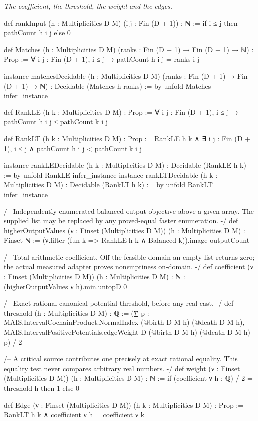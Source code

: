 \documentclass[11pt,a4paper]{article}
\theoremstyle{definition}
\theoremstyle{remark}
\numberwithin{equation}{section}
\begin{document}
\emph{The coefficient, the threshold, the weight and the edges.}
\begin{LeanCode}
def rankInput (h : Multiplicities D M) (i j : Fin (D + 1)) : ℕ :=
  if i ≤ j then pathCount h i j else 0

def Matches (h : Multiplicities D M)
    (ranks : Fin (D + 1) → Fin (D + 1) → ℕ) : Prop :=
  ∀ i j : Fin (D + 1), i ≤ j → pathCount h i j = ranks i j

instance matchesDecidable (h : Multiplicities D M)
    (ranks : Fin (D + 1) → Fin (D + 1) → ℕ) : Decidable (Matches h ranks) := by
  unfold Matches
  infer_instance

def RankLE (h k : Multiplicities D M) : Prop :=
  ∀ i j : Fin (D + 1), i ≤ j → pathCount h i j ≤ pathCount k i j

def RankLT (h k : Multiplicities D M) : Prop :=
  RankLE h k ∧ ∃ i j : Fin (D + 1), i ≤ j ∧ pathCount h i j < pathCount k i j

instance rankLEDecidable (h k : Multiplicities D M) : Decidable (RankLE h k) := by
  unfold RankLE
  infer_instance
instance rankLTDecidable (h k : Multiplicities D M) : Decidable (RankLT h k) := by
  unfold RankLT
  infer_instance

/-- Independently enumerated balanced-output objective above a given array.
The supplied list may be replaced by any proved-equal faster enumeration. -/
def higherOutputValues (ν : Finset (Multiplicities D M)) (h : Multiplicities D M) : Finset ℕ :=
  (ν.filter (fun k => RankLE h k ∧ Balanced k)).image outputCount

/-- Total arithmetic coefficient. Off the feasible domain an empty list
returns zero; the actual measured adapter proves nonemptiness on-domain. -/
def coefficient (ν : Finset (Multiplicities D M)) (h : Multiplicities D M) : ℕ :=
  (higherOutputValues ν h).min.untopD 0

/-- Exact rational canonical potential threshold, before any real cast. -/
def threshold (h : Multiplicities D M) : ℚ :=
  (∑ p : MAIS.IntervalCochainProduct.NormalIndex
      (@birth D M h) (@death D M h),
    MAIS.IntervalPositivePotentials.edgeWeight D (@birth D M h) (@death D M h) p) / 2

/-- A critical source contributes one precisely at exact rational equality.
This equality test never compares arbitrary real numbers. -/
def weight (ν : Finset (Multiplicities D M)) (h : Multiplicities D M) : ℕ :=
  if (coefficient ν h : ℚ) / 2 = threshold h then 1 else 0

def Edge (ν : Finset (Multiplicities D M)) (h k : Multiplicities D M) : Prop :=
  RankLT h k ∧ coefficient ν h = coefficient ν k
\end{LeanCode}
\end{document}
